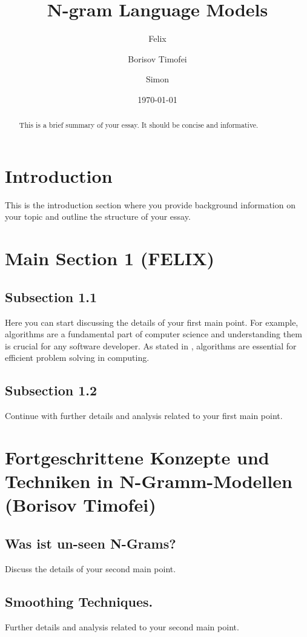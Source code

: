 \documentclass[12pt]{article}
\title{N-gram Language Models}
\author{
  Felix \\
  \and
  Borisov Timofei \\
  \and
  Simon \\
}
\date{\today}
\begin{document}
\maketitle

\begin{abstract}
This is a brief summary of your essay. It should be concise and informative.
\end{abstract}

\tableofcontents
\newpage

\section{Introduction}
This is the introduction section where you provide background information on your topic and outline the structure of your essay.

\section{Main Section 1 (FELIX)}
\subsection{Subsection 1.1}
Here you can start discussing the details of your first main point. For example, algorithms are a fundamental part of computer science and understanding them is crucial for any software developer. As stated in \cite{cormen2009}, algorithms are essential for efficient problem solving in computing.

\subsection{Subsection 1.2}
Continue with further details and analysis related to your first main point.

\section{Fortgeschrittene Konzepte und Techniken in N-Gramm-Modellen (Borisov Timofei)}
\subsection{Was ist un-seen N-Grams?}
Discuss the details of your second main point.

\subsection{Smoothing Techniques.}
Further details and analysis related to your second main point.
\end{document}
